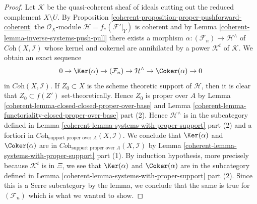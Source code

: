 \begin{proof}
\medskip\noindent
Let $\mathcal{K}$ be the quasi-coherent sheaf of ideals cutting
out the reduced complement $X \setminus U$. By
Proposition \ref{coherent-proposition-proper-pushforward-coherent}
the $\mathcal{O}_X$-module $\mathcal{H} = f_*(\mathcal{F}'|_Y)$ is coherent
and by Lemma \ref{coherent-lemma-inverse-systems-push-pull}
there exists a morphism $\alpha : (\mathcal{F}_n) \to \mathcal{H}^\wedge$
of $\textit{Coh}(X, \mathcal{I})$ whose kernel and cokernel are
annihilated by a power $\mathcal{K}^t$ of $\mathcal{K}$.
We obtain an exact sequence
$$
0 \to \Ker(\alpha) \to (\mathcal{F}_n) \to
\mathcal{H}^\wedge \to \Coker(\alpha) \to 0
$$
in $\textit{Coh}(X, \mathcal{I})$. If $Z_0 \subset X$ is the scheme theoretic
support of $\mathcal{H}$, then it is clear that $Z_0 \subset f(Z')$
set-theoretically. Hence $Z_0$ is proper over $A$ by
Lemma \ref{coherent-lemma-closed-closed-proper-over-base} and
Lemma \ref{coherent-lemma-functoriality-closed-proper-over-base} part (2).
Hence $\mathcal{H}^\wedge$ is in the subcategory defined in
Lemma \ref{coherent-lemma-systems-with-proper-support} part (2)
and a fortiori in
$\textit{Coh}_{\text{support proper over }A}(X, \mathcal{I})$.
We conclude that $\Ker(\alpha)$ and $\Coker(\alpha)$
are in $\textit{Coh}_{\text{support proper over }A}(X, \mathcal{I})$
by Lemma \ref{coherent-lemma-systems-with-proper-support} part (1).
By induction hypothesis, more precisely because $\mathcal{K}^t$ is in $\Xi$,
we see that $\Ker(\alpha)$ and $\Coker(\alpha)$ are in
the subcategory defined in
Lemma \ref{coherent-lemma-systems-with-proper-support} part (2).
Since this is a Serre subcategory by the lemma, we conclude that the
same is true for $(\mathcal{F}_n)$ which is what we wanted to show.
\end{proof}


